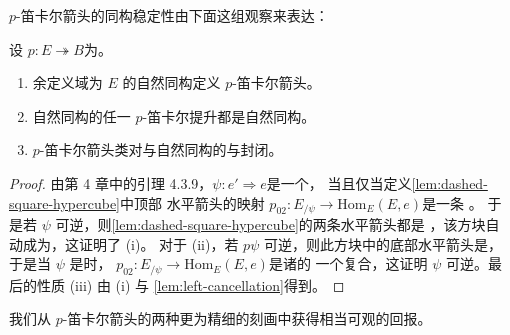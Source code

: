 $p$-笛卡尔箭头的同构稳定性由下面这组观察来表达：

\begin{lemma}\label{lem:isomorphism-stability}
设 $p\colon E\twoheadrightarrow B$为\trIsofibration。
\begin{enumerate}[label=(\roman*)]
\item 余定义域为 $E$ 的自然同构定义 $p$-笛卡尔箭头。
\item 自然同构的任一 $p$-笛卡尔提升都是自然同构。
\item $p$-笛卡尔箭头类对与自然同构的\trPreComposition{}与\trPostComposition{}封闭。
\end{enumerate}
\end{lemma}

\begin{proof}
由第 4 章中的引理 4.3.9，$\psi\colon e'\Rightarrow e$是一个\trIsomorphism，
当且仅当定义\cref{lem:dashed-square-hypercube}中\trWeaklyCartesianSquare{}顶部%
水平箭头的映射 $p_{02}\colon E_{/\psi}\to\mathrm{Hom}_{E}(E,e)$是一条%
\trTrivialFibration。
于是若 $\psi$ 可逆，则\cref{lem:dashed-square-hypercube}的两条水平箭头都是%
\trTrivialFibration，该方块自动成为\trWeaklyCartesianSquare，这证明了 (i)。
对于 (ii)，若 $p\psi$ 可逆，则此方块中的底部水平箭头是\trTrivialFibration，
于是当 $\psi$ 是\trWeaklyCartesian{}时，%
$p_{02}\colon E_{/\psi}\to\mathrm{Hom}_{E}(E,e)$是诸\trTrivialFibration{}的%
一个复合，这证明 $\psi$ 可逆。最后的性质 (iii) 由 (i) 与%
\cref{lem:left-cancellation}得到。
\end{proof}

我们从 $p$-笛卡尔箭头的两种更为精细的刻画中获得相当可观的回报。

